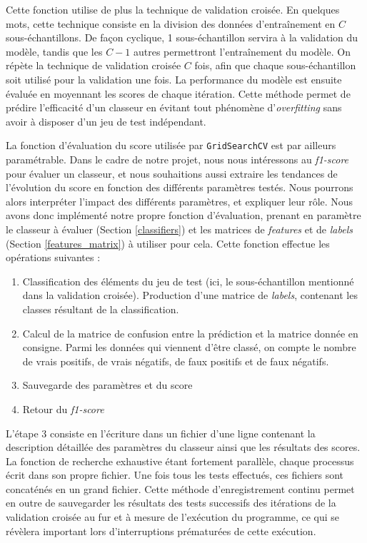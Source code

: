 \documentclass[a4paper]{report}
\begin{document}
Cette fonction utilise de plus la technique de validation croisée. En quelques mots, cette technique consiste en la division des données d'entraînement en $C$ sous-échantillons. De façon cyclique, 1 sous-échantillon servira à la validation du modèle, tandis que les $C-1$ autres permettront l'entraînement du modèle. On répète la technique de validation croisée $C$ fois, afin que chaque sous-échantillon soit utilisé pour la validation une fois. La performance du modèle est ensuite évaluée en moyennant les scores de chaque itération. Cette méthode permet de prédire l'efficacité d'un classeur en évitant tout phénomène d'\emph{overfitting} sans avoir à disposer d'un jeu de test indépendant.

La fonction d'évaluation du score utilisée par \texttt{GridSearchCV} est par ailleurs paramétrable. Dans le cadre de notre projet, nous nous intéressons au \emph{f1-score} pour évaluer un classeur, et nous souhaitions aussi extraire les tendances de l'évolution du score en fonction des différents paramètres testés. Nous pourrons alors interpréter l'impact des différents paramètres, et expliquer leur rôle. Nous avons donc implémenté notre propre fonction d'évaluation, prenant en paramètre le classeur à évaluer (Section \ref{classifiers}) et les matrices de \emph{features} et de \emph{labels} (Section \ref{features_matrix}) à utiliser pour cela. Cette fonction effectue les opérations suivantes :

\begin{enumerate}
\item Classification des éléments du jeu de test (ici, le sous-échantillon mentionné dans la validation croisée). Production d'une matrice de \emph{labels}, contenant les classes résultant de la classification.
\item Calcul de la matrice de confusion entre la prédiction et la matrice donnée en consigne. Parmi les données qui viennent d'être classé, on compte le nombre de vrais positifs, de vrais négatifs, de faux positifs et de faux négatifs.
\item Sauvegarde des paramètres et du score
\item Retour du \emph{f1-score}
\end{enumerate}

L'étape 3 consiste en l'écriture dans un fichier d'une ligne contenant la description détaillée des paramètres du classeur ainsi que les résultats des scores. La fonction de recherche exhaustive étant fortement parallèle, chaque processus écrit dans son propre fichier. Une fois tous les tests effectués, ces fichiers sont concaténés en un grand fichier. Cette méthode d'enregistrement continu permet en outre de sauvegarder les résultats des tests successifs des itérations de la validation croisée au fur et à mesure de l'exécution du programme, ce qui se révèlera important lors d'interruptions prématurées de cette exécution.
\end{document}
